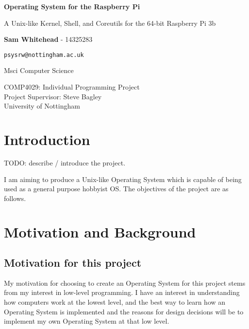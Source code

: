 \documentclass{article}
\begin{document}
\begin{titlepage}
    \begin{center}
        \null\mbox{}\vfill

        \vspace*{1cm}

        \huge
        \textbf{Operating System for the Raspberry Pi}

        \vspace{0.5cm}
        \Large
        A Unix-like Kernel, Shell, and Coreutils for the 64-bit Raspberry Pi 3b

        \Large

        \vspace{1.5cm}

        \textbf{Sam Whitehead} - 14325283

        \texttt{psysrw@nottingham.ac.uk}

        Msci Computer Science

        \vfill

        COMP4029: Individual Programming Project\\
        Project Supervisor: Steve Bagley\\
        University of Nottingham

        \vfill\null
    \end{center}
    \thispagestyle{empty}
\end{titlepage}

\section{Introduction}
TODO: describe / introduce the project.

I am aiming to produce a Unix-like Operating System which is capable of being
used as a general purpose hobbyist OS. The objectives of the project are as
follows.


\section{Motivation and Background}
\subsection*{Motivation for this project}
My motivation for choosing to create an Operating System for this project stems
from my interest in low-level programming. I have an interest in understanding
how computers work at the lowest level, and the best way to learn how an
Operating System is implemented and the reasons for design decisions will be to
implement my own Operating System at that low level.
\end{document}
